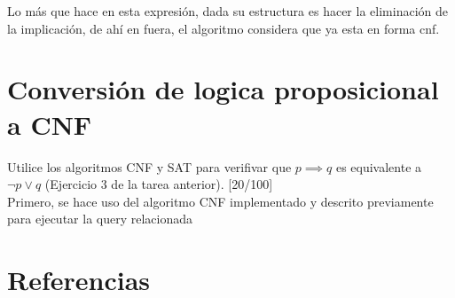 \documentclass[11pt, letterpaper]{article}
\begin{document}
	Lo más que hace en esta expresión, dada su estructura es hacer la eliminación de la implicación, de ahí en fuera, el algoritmo considera que ya esta en forma cnf.
	
	
	
	
	
	
	
	\newpage

	\section{Conversión de logica proposicional a CNF}

	Utilice los algoritmos CNF y SAT para verifivar que $p \implies q$ es equivalente a $\neg p \vee q$ (Ejercicio 3 de la tarea anterior). [20/100] \\
	
	Primero, se hace uso del algoritmo CNF implementado y descrito previamente para ejecutar la query relacionada

		
\newpage


\section{Referencias}  %


	
	
\end{document}
